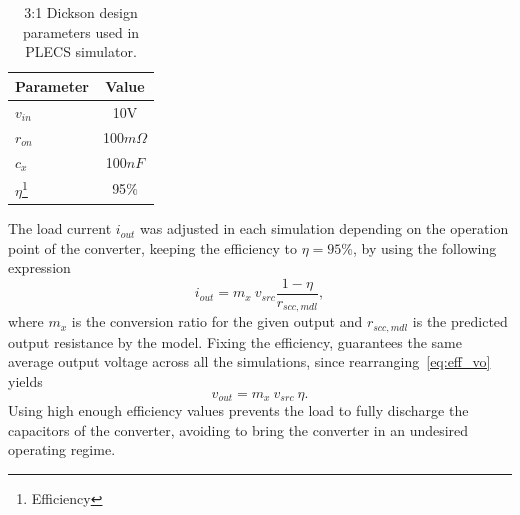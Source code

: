 \begin{table}[h]
\centering
\caption{3:1 Dickson design parameters used in PLECS simulator.}
\section{\label{tab:sim_values}}
\renewcommand{\arraystretch}{1.5}%
\begin{tabular}{l | c  }
 Parameter  &  Value  \\
 \midrule
 $v_{in}$   & 10V \\
 $r_{on}$   & 100$m\Omega$ \\
 $c_x$      & 100$nF$\\
 $\eta$\footnote{Efficiency} & 95$\%$
\end{tabular}
\end{table}

The load current $i_{out}$ was adjusted in each simulation depending on the operation point of the converter, keeping the efficiency to $\eta=95\%$, by using the following expression
\begin{equation}
    i_{out}=m_x~v_{src}\frac{1-\eta}{r_{scc,mdl}},
\label{eq:iout_eff}
\end{equation}
where $m_x$ is the conversion ratio for the given output and $r_{scc,mdl}$ is the predicted output resistance by the model. Fixing the efficiency, guarantees the same average output voltage across all the simulations, since rearranging~\eqref{eq:eff_vo} yields
\begin{equation}
    v_{out}=m_x~v_{src}~\eta.
\label{eq:vout_eff}
\end{equation}
Using high enough efficiency values prevents the load to fully discharge the capacitors of the converter, avoiding to bring the converter in an undesired operating regime.


